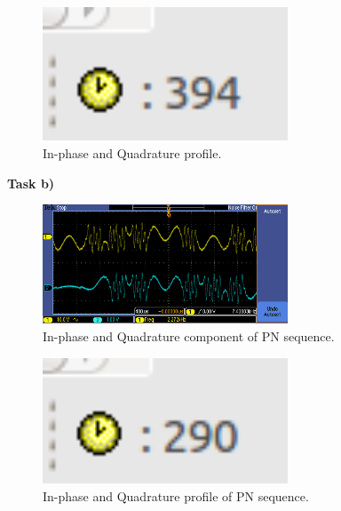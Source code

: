 \documentclass{article}
\begin{document}
\begin{figure}[h]
  \begin{center}
    \includegraphics[width=0.65\textwidth]{img/task_a_profile.png}
    \caption{In-phase and Quadrature profile.}
  \end{center}
\end{figure}

\pagebreak
\textbf{Task b)}

\begin{figure}[h]
  \begin{center}
    \includegraphics[width=0.65\textwidth]{img/task_b_oscilloscope.png}
    \caption{In-phase and Quadrature component of PN sequence.}
  \end{center}
\end{figure}

\begin{figure}[h]
  \begin{center}
    \includegraphics[width=0.65\textwidth]{img/task_b_profile.png}
    \caption{In-phase and Quadrature profile of PN sequence.}
  \end{center}
\end{figure}
\end{document}
